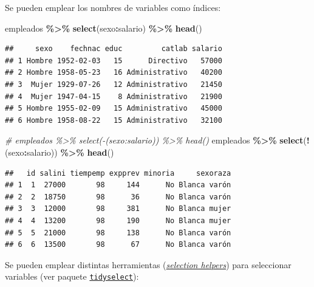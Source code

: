 \documentclass[
]{book}
\newenvironment{Shaded}{\begin{snugshade}}{\end{snugshade}}
\newcommand{\CommentTok}[1]{\textcolor[rgb]{0.56,0.35,0.01}{\textit{#1}}}
\newcommand{\FunctionTok}[1]{\textcolor[rgb]{0.13,0.29,0.53}{\textbf{#1}}}
\newcommand{\NormalTok}[1]{#1}
\newcommand{\SpecialCharTok}[1]{\textcolor[rgb]{0.81,0.36,0.00}{\textbf{#1}}}
\begin{document}
Se pueden emplear los nombres de variables como índices:

\begin{Shaded}
\begin{Highlighting}[]
\NormalTok{empleados }\SpecialCharTok{\%\textgreater{}\%} \FunctionTok{select}\NormalTok{(sexo}\SpecialCharTok{:}\NormalTok{salario) }\SpecialCharTok{\%\textgreater{}\%} \FunctionTok{head}\NormalTok{()}
\end{Highlighting}
\end{Shaded}

\begin{verbatim}
##     sexo    fechnac educ         catlab salario
## 1 Hombre 1952-02-03   15      Directivo   57000
## 2 Hombre 1958-05-23   16 Administrativo   40200
## 3  Mujer 1929-07-26   12 Administrativo   21450
## 4  Mujer 1947-04-15    8 Administrativo   21900
## 5 Hombre 1955-02-09   15 Administrativo   45000
## 6 Hombre 1958-08-22   15 Administrativo   32100
\end{verbatim}

\begin{Shaded}
\begin{Highlighting}[]
\CommentTok{\# empleados \%\textgreater{}\% select({-}(sexo:salario)) \%\textgreater{}\% head()}
\NormalTok{empleados }\SpecialCharTok{\%\textgreater{}\%} \FunctionTok{select}\NormalTok{(}\SpecialCharTok{!}\NormalTok{(sexo}\SpecialCharTok{:}\NormalTok{salario)) }\SpecialCharTok{\%\textgreater{}\%} \FunctionTok{head}\NormalTok{()}
\end{Highlighting}
\end{Shaded}

\begin{verbatim}
##   id salini tiempemp expprev minoria     sexoraza
## 1  1  27000       98     144      No Blanca varón
## 2  2  18750       98      36      No Blanca varón
## 3  3  12000       98     381      No Blanca mujer
## 4  4  13200       98     190      No Blanca mujer
## 5  5  21000       98     138      No Blanca varón
## 6  6  13500       98      67      No Blanca varón
\end{verbatim}

Se pueden emplear distintas herramientas (\emph{\href{https://tidyselect.r-lib.org/reference/language.html}{selection helpers}}) para seleccionar variables (ver paquete \href{https://tidyselect.r-lib.org}{\texttt{tidyselect}}):
\end{document}
